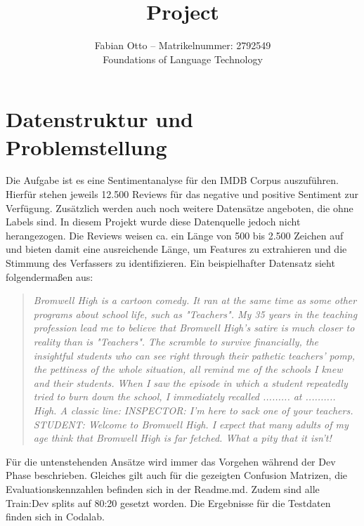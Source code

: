 \documentclass[12pt]{scrartcl}
\begin{document}
    \title{Project}
    \author{Fabian Otto -- Matrikelnummer: 2792549\\
    Foundations of Language Technology}
    \maketitle

    \section{Datenstruktur und Problemstellung}

    Die Aufgabe ist es eine Sentimentanalyse für den IMDB Corpus auszuführen.
    Hierfür stehen jeweils 12.500 Reviews für das negative und positive Sentiment zur Verfügung.
    Zusätzlich werden auch noch weitere Datensätze angeboten, die ohne Labels sind.
    In diesem Projekt wurde diese Datenquelle jedoch nicht herangezogen.
    Die Reviews weisen ca. ein Länge von 500 bis 2.500 Zeichen auf und bieten damit eine ausreichende Länge, um Features zu extrahieren und die Stimmung des Verfassers zu identifizieren.
    Ein beispielhafter Datensatz sieht folgendermaßen aus:
    \begin{quote}
        \textit{
        Bromwell High is a cartoon comedy.
        It ran at the same time as some other programs about school life, such as "Teachers".
        My 35 years in the teaching profession lead me to believe that Bromwell High's satire is much closer to reality than is "Teachers".
        The scramble to survive financially, the insightful students who can see right through their pathetic teachers' pomp,
        the pettiness of the whole situation, all remind me of the schools I knew and their students.
        When I saw the episode in which a student repeatedly tried to burn down the school, I immediately recalled ......... at .......... High.
        A classic line: INSPECTOR: I'm here to sack one of your teachers.
        STUDENT: Welcome to Bromwell High.
        I expect that many adults of my age think that Bromwell High is far fetched.
        What a pity that it isn't!
        }
    \end{quote}

    Für die untenstehenden Ansätze wird immer das Vorgehen während der Dev Phase beschrieben.
    Gleiches gilt auch für die gezeigten Confusion Matrizen, die Evaluationskennzahlen befinden sich in der Readme.md.
    Zudem sind alle Train:Dev splits auf 80:20 gesetzt worden.
    Die Ergebnisse für die Testdaten finden sich in Codalab.
\end{document}

